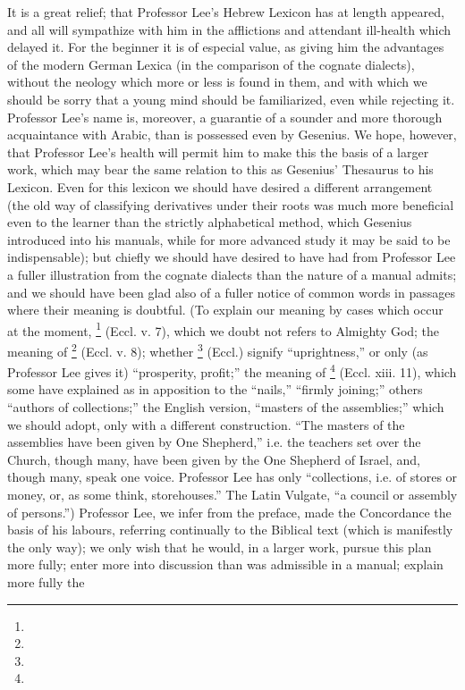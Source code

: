 It is a great relief; that Professor Lee's Hebrew
Lexicon has at length appeared, and all will sympathize with him in the
afflictions and attendant ill-health which delayed it. For the beginner
it is of especial value, as giving him the advantages of the modern
German Lexica (in the comparison of the cognate dialects), without the
neology which more or less is found in them, and with which we should be
sorry that a young mind should be familiarized, even while rejecting it.
Professor Lee's name is, moreover, a guarantie of a sounder and more
thorough acquaintance with Arabic, than is possessed even by
Gesenius. We hope, however, that Professor Lee's health will permit
him to make this the basis of a larger work, which may bear the same
relation to this as Gesenius' Thesaurus to his Lexicon. Even for this
lexicon we should have desired a different arrangement (the old way of
classifying derivatives under their roots was much more beneficial even
to the learner than the strictly alphabetical method, which Gesenius
introduced into his manuals, while for more advanced study it may be
said to be indispensable); but chiefly we should have desired to have
had from Professor Lee a fuller illustration from the cognate dialects
than the nature of a manual admits; and we should have been glad also of
a fuller notice of common words in passages where their meaning is
doubtful. (To explain our meaning by cases which occur at the moment, \footnote{}
(Eccl. v. 7), which we doubt not refers to Almighty God; the meaning of
\footnote{} (Eccl. v. 8); whether \footnote{}
(Eccl.) signify ``uprightness,'' or only (as Professor Lee gives it) ``prosperity, profit;'' the meaning of \footnote{}
(Eccl. xiii. 11), which some have explained as in apposition to the ``nails,''
``firmly joining;'' others ``authors of collections;''
the English version, ``masters of the assemblies;'' which we should
adopt, only with a different construction. ``The masters of the
assemblies have been given by One Shepherd,'' i.e. the teachers set
over the Church, though many, have been given by the One Shepherd of
Israel, and, though many, speak one voice. Professor Lee has only ``collections, i.e. of stores or money, or, as some think,
storehouses.'' The Latin Vulgate, ``a council or assembly of
persons.'') Professor Lee, we infer from the preface, made the
Concordance the basis of his labours, referring continually to the
Biblical text (which is manifestly the only way); we only wish that he
would, in a larger work, pursue this plan more fully; enter more into
discussion than was admissible in a manual; explain more fully the
